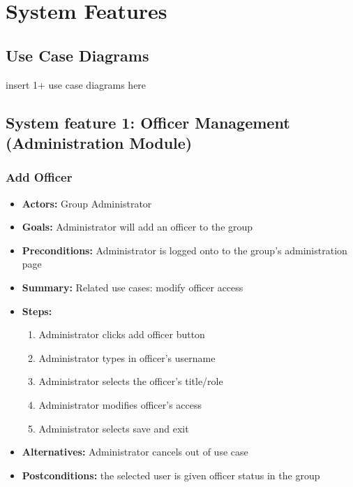\documentclass[12pt, oneside, letterpaper]{report}
\begin{document}
	\section{System Features}
		\subsection{Use Case Diagrams}
		insert 1+ use case diagrams here
		\subsection{System feature 1: Officer Management (Administration
			Module)}
			\subsubsection{Add Officer}
			\begin{itemize}
				\item{\textbf{Actors:} Group Administrator}
				\item{\textbf{Goals:} Administrator will add an officer
					to the group}
				\item{\textbf{Preconditions:} Administrator is logged onto
					to the group's administration page}
				\item{\textbf{Summary:} Related use cases: modify officer
					access}
				\item{\textbf{Steps:}
				\begin{enumerate}
					\item{Administrator clicks add officer button}
					\item{Administrator types in officer's username}
					\item{Administrator selects the officer's title/role}
					\item{Administrator modifies officer's access}
					\item{Administrator selects save and exit}
				\end{enumerate}
				}
				\item{\textbf{Alternatives:} Administrator cancels out of
					use case}
				\item{\textbf{Postconditions:} the selected user is given
					officer status in the group}
			\end{itemize}
\end{document}
